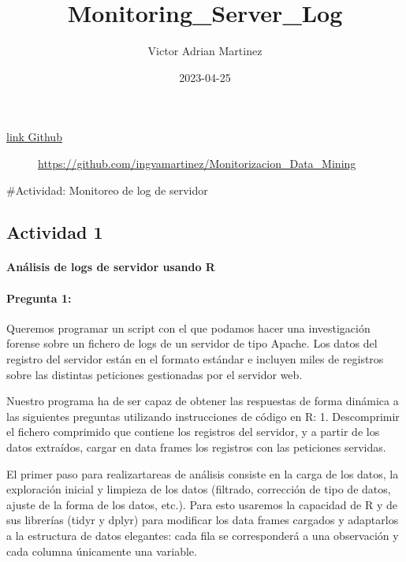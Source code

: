 \documentclass[
]{article}
\title{Monitoring\_Server\_Log}
\author{Victor Adrian Martinez}
\date{2023-04-25}
\begin{document}
\maketitle

\begin{description}
\item[\href{https://github.com/ingvamartinez/Monitorizacion_Data_Mining}{link
Github}]
\url{https://github.com/ingvamartinez/Monitorizacion_Data_Mining}
\end{description}

\#Actividad: Monitoreo de log de servidor

\hypertarget{actividad-1}{%
\subsection{Actividad 1}\label{actividad-1}}

\hypertarget{anuxe1lisis-de-logs-de-servidor-usando-r}{%
\paragraph{Análisis de logs de servidor usando
R}\label{anuxe1lisis-de-logs-de-servidor-usando-r}}

\hypertarget{pregunta-1}{%
\paragraph{Pregunta 1:}\label{pregunta-1}}

Queremos programar un script con el que podamos hacer una investigación
forense sobre un fichero de logs de un servidor de tipo Apache. Los
datos del registro del servidor están en el formato estándar e incluyen
miles de registros sobre las distintas peticiones gestionadas por el
servidor web.

Nuestro programa ha de ser capaz de obtener las respuestas de forma
dinámica a las siguientes preguntas utilizando instrucciones de código
en R: 1. Descomprimir el fichero comprimido que contiene los registros
del servidor, y a partir de los datos extraídos, cargar en data frames
los registros con las peticiones servidas.

El primer paso para realizartareas de análisis consiste en la carga de
los datos, la exploración inicial y limpieza de los datos (filtrado,
corrección de tipo de datos, ajuste de la forma de los datos, etc.).
Para esto usaremos la capacidad de R y de sus librerías (tidyr y dplyr)
para modificar los data frames cargados y adaptarlos a la estructura de
datos elegantes: cada fila se corresponderá a una observación y cada
columna únicamente una variable.
\end{document}
